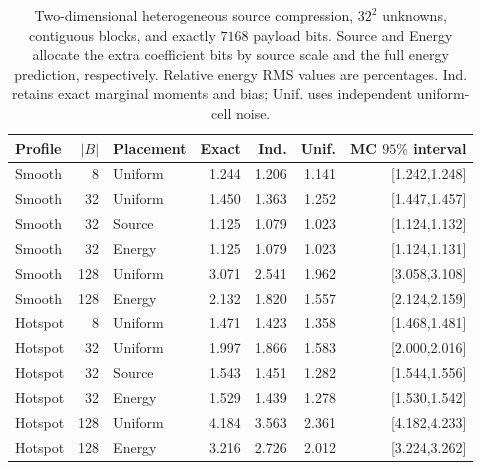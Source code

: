 \begin{table}[tb]
\centering
\caption{Two-dimensional heterogeneous source compression, $32^2$ unknowns,
contiguous blocks, and exactly $7168$ payload bits. Source and Energy allocate
the extra coefficient bits by source scale and the full energy prediction,
respectively. Relative energy RMS values are percentages. Ind. retains exact
marginal moments and bias; Unif. uses independent uniform-cell noise.}
\label{tab:revision-elliptic2d}
\begingroup\footnotesize\setlength{\tabcolsep}{3pt}
\begin{tabular}{lrlrrrr}
\toprule
Profile & $|B|$ & Placement & Exact & Ind. & Unif. & MC $95\%$ interval\\
\midrule
Smooth & 8 & Uniform & 1.244 & 1.206 & 1.141 & [1.242,1.248] \\
Smooth & 32 & Uniform & 1.450 & 1.363 & 1.252 & [1.447,1.457] \\
Smooth & 32 & Source & 1.125 & 1.079 & 1.023 & [1.124,1.132] \\
Smooth & 32 & Energy & 1.125 & 1.079 & 1.023 & [1.124,1.131] \\
Smooth & 128 & Uniform & 3.071 & 2.541 & 1.962 & [3.058,3.108] \\
Smooth & 128 & Energy & 2.132 & 1.820 & 1.557 & [2.124,2.159] \\
Hotspot & 8 & Uniform & 1.471 & 1.423 & 1.358 & [1.468,1.481] \\
Hotspot & 32 & Uniform & 1.997 & 1.866 & 1.583 & [2.000,2.016] \\
Hotspot & 32 & Source & 1.543 & 1.451 & 1.282 & [1.544,1.556] \\
Hotspot & 32 & Energy & 1.529 & 1.439 & 1.278 & [1.530,1.542] \\
Hotspot & 128 & Uniform & 4.184 & 3.563 & 2.361 & [4.182,4.233] \\
Hotspot & 128 & Energy & 3.216 & 2.726 & 2.012 & [3.224,3.262] \\
\bottomrule
\end{tabular}\endgroup
\end{table}
